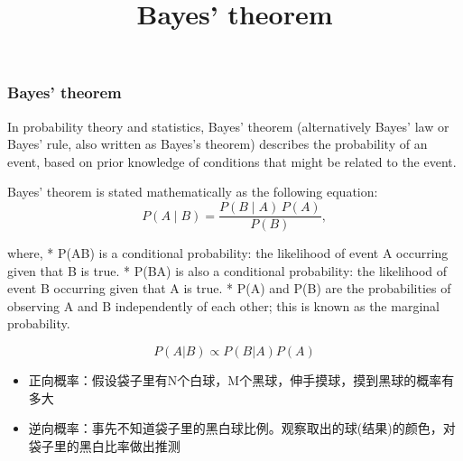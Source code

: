 \documentclass[11pt]{article}
\title{Bayes' theorem}
\providecommand{\tightlist}{%
      \setlength{\itemsep}{0pt}\setlength{\parskip}{0pt}}
\begin{document}
    
    
    \maketitle
    
    

    
    \subsubsection{Bayes' theorem}\label{bayes-theorem}

In probability theory and statistics, Bayes' theorem (alternatively
Bayes' law or Bayes' rule, also written as Bayes's theorem) describes
the probability of an event, based on prior knowledge of conditions that
might be related to the event.

Bayes' theorem is stated mathematically as the following equation:
\[ P(A\mid B)={\frac {P(B\mid A)\,P(A)}{P(B)}},\]

where, * P(A\textbar{}B) is a conditional probability: the likelihood of
event A occurring given that B is true. * P(B\textbar{}A) is also a
conditional probability: the likelihood of event B occurring given that
A is true. * P(A) and P(B) are the probabilities of observing A and B
independently of each other; this is known as the marginal probability.

\[P(A|B) \propto P(B|A)P(A)\]

    \begin{itemize}
\tightlist
\item
  正向概率：假设袋子里有N个白球，M个黑球，伸手摸球，摸到黑球的概率有多大
\item
  逆向概率：事先不知道袋子里的黑白球比例。观察取出的球(结果)的颜色，对袋子里的黑白比率做出推测
\end{itemize}
\end{document}
